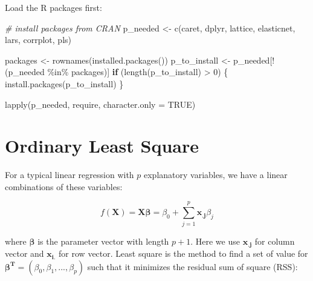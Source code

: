 \documentclass[
  12pt,
]{krantz}
\makeatletter
\newenvironment{Shaded}{\begin{snugshade}}{\end{snugshade}}
\newcommand{\AttributeTok}[1]{\textcolor[rgb]{0.61,0.61,0.61}{#1}}
\newcommand{\CommentTok}[1]{\textcolor[rgb]{0.37,0.37,0.37}{\textit{#1}}}
\newcommand{\ConstantTok}[1]{\textcolor[rgb]{0,0,0}{#1}}
\newcommand{\ControlFlowTok}[1]{\textcolor[rgb]{0.27,0.27,0.27}{\textbf{#1}}}
\newcommand{\DecValTok}[1]{\textcolor[rgb]{0.06,0.06,0.06}{#1}}
\newcommand{\FunctionTok}[1]{\textcolor[rgb]{0,0,0}{#1}}
\newcommand{\NormalTok}[1]{#1}
\newcommand{\OtherTok}[1]{\textcolor[rgb]{0.37,0.37,0.37}{#1}}
\newcommand{\SpecialCharTok}[1]{\textcolor[rgb]{0,0,0}{#1}}
\newcommand{\StringTok}[1]{\textcolor[rgb]{0.5,0.5,0.5}{#1}}
\newenvironment{kframe}{%
\medskip{}
\setlength{\fboxsep}{.8em}
 \def\at@end@of@kframe{}%
 \ifinner\ifhmode%
  \def\at@end@of@kframe{\end{minipage}}%
  \begin{minipage}{\columnwidth}%
 \fi\fi%
 \def\FrameCommand##1{\hskip\@totalleftmargin \hskip-\fboxsep
 \colorbox{shadecolor}{##1}\hskip-\fboxsep
     \hskip-\linewidth \hskip-\@totalleftmargin \hskip\columnwidth}%
 \MakeFramed {\advance\hsize-\width
   \@totalleftmargin\z@ \linewidth\hsize
   \@setminipage}}%
 {\par\unskip\endMakeFramed%
 \at@end@of@kframe}
\renewenvironment{Shaded}{\begin{kframe}}{\end{kframe}}
\makeatother
\begin{document}
Load the R packages first:

\begin{Shaded}
\begin{Highlighting}[]
\CommentTok{\# install packages from CRAN}
\NormalTok{p\_needed }\OtherTok{\textless{}{-}} \FunctionTok{c}\NormalTok{(}\StringTok{\textquotesingle{}caret\textquotesingle{}}\NormalTok{, }\StringTok{\textquotesingle{}dplyr\textquotesingle{}}\NormalTok{, }\StringTok{\textquotesingle{}lattice\textquotesingle{}}\NormalTok{,}
              \StringTok{\textquotesingle{}elasticnet\textquotesingle{}}\NormalTok{, }\StringTok{\textquotesingle{}lars\textquotesingle{}}\NormalTok{, }\StringTok{\textquotesingle{}corrplot\textquotesingle{}}\NormalTok{, }
              \StringTok{\textquotesingle{}pls\textquotesingle{}}\NormalTok{)}

\NormalTok{packages }\OtherTok{\textless{}{-}} \FunctionTok{rownames}\NormalTok{(}\FunctionTok{installed.packages}\NormalTok{())}
\NormalTok{p\_to\_install }\OtherTok{\textless{}{-}}\NormalTok{ p\_needed[}\SpecialCharTok{!}\NormalTok{(p\_needed }\SpecialCharTok{\%in\%}\NormalTok{ packages)]}
\ControlFlowTok{if}\NormalTok{ (}\FunctionTok{length}\NormalTok{(p\_to\_install) }\SpecialCharTok{\textgreater{}} \DecValTok{0}\NormalTok{) \{}
    \FunctionTok{install.packages}\NormalTok{(p\_to\_install)}
\NormalTok{\}}

\FunctionTok{lapply}\NormalTok{(p\_needed, require, }\AttributeTok{character.only =} \ConstantTok{TRUE}\NormalTok{)}
\end{Highlighting}
\end{Shaded}

\hypertarget{ordinary-least-square}{%
\section{Ordinary Least Square}\label{ordinary-least-square}}

For a typical linear regression with \(p\) explanatory variables, we have a linear combinations of these variables:

\[f(\mathbf{X})=\mathbf{X}\symbf{\beta}=\beta_{0}+\sum_{j=1}^{p}\mathbf{x_{.j}}\beta_{j}\]

where \(\symbf{\beta}\) is the parameter vector with length \(p+1\). Here we use \(\mathbf{x_{.j}}\) for column vector and \(\mathbf{x_{i.}}\) for row vector. Least square is the method to find a set of value for \(\symbf{\beta^{T}}=(\beta_{0},\beta_{1},...,\beta_{p})\) such that it minimizes the residual sum of square (RSS):
\end{document}
